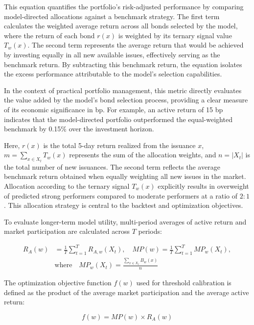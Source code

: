 This equation quantifies the portfolio's risk-adjusted performance by comparing model-directed allocations against a benchmark strategy. The first term calculates the weighted average return across all bonds selected by the model, where the return of each bond $r(x)$ is weighted by its ternary signal value $T_w(x)$. The second term represents the average return that would be achieved by investing equally in all new available issues, effectively serving as the benchmark return. By subtracting this benchmark return, the equation isolates the excess performance attributable to the model's selection capabilities.

In the context of practical portfolio management, this metric directly evaluates the value added by the model's bond selection process, providing a clear measure of its economic significance in bp. For example, an active return of 15 bp indicates that the model-directed portfolio outperformed the equal-weighted benchmark by 0.15\% over the investment horizon.

Here, $r(x)$ is the total 5-day return realized from the issuance $x$, $m = \sum_{x \in X_t} T_w(x)$ represents the sum of the allocation weights, and $n = |X_t|$ is the total number of new issuances. The second term reflects the average benchmark return obtained when equally weighting all new issues in the market. Allocation according to the ternary signal $T_w(x)$ explicitly results in overweight of predicted strong performers compared to moderate performers at a ratio of $2:1$. This allocation strategy is central to the backtest and optimization objectives.

To evaluate longer-term model utility, multi-period averages of active return and market participation are calculated across $T$ periods:

\begin{equation}
\begin{split}
R_A(w) &= \frac{1}{T}\sum_{t=1}^{T} R_{A,w}(X_t), \quad MP(w) = \frac{1}{T}\sum_{t=1}^{T} MP_w(X_t), \\
&\text{where} \quad MP_w(X_t) = \frac{\sum_{x \in X_t} B_w(x)}{n}
\end{split}
\tag{4.7}
\end{equation}

The optimization objective function $f(w)$ used for threshold calibration is defined as the product of the average market participation and the average active return:

\begin{equation}
f(w) = MP(w) \times R_A(w)
\end{equation}

